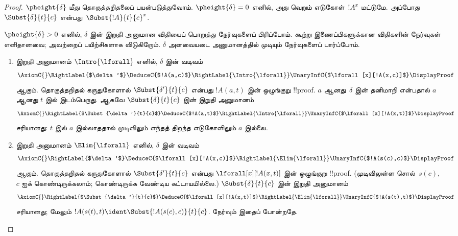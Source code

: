 \documentclass[../../../include/open-logic-section]{subfiles}
\begin{document}
\begin{proof}
  $\pheight{\delta}$ மீது தொகுத்தறிதலைப் பயன்படுத்துவோம்.
  $\pheight{\delta} = 0$ எனில், அது வெறும்
  எடுகோள்~$!A^x$ மட்டுமே. அப்போது
  $\Subst{\delta}{t}{c}$ என்பது~$\Subst{!A}{t}{c}^x$.

  $\pheight{\delta} > 0$ எனில், $\delta$ இன் இறுதி
  அனுமான விதியைப் பொறுத்து நேர்வுகளைப் பிரிப்போம்.
  கூற்று இணைப்பிகளுக்கான விதிகளின் நேர்வுகள் எளிதானவை;
  அவற்றைப் பயிற்சிகளாக விடுகிறோம். $\delta$ அளவையடை
  அனுமானத்தில் முடியும் நேர்வுகளைப் பார்ப்போம்.
  \begin{enumerate}
    \item இறுதி அனுமானம் $\Intro{\lforall}$ எனில்,
    $\delta$ இன் வடிவம்
    \[
    \AxiomC{}
    \RightLabel{$\delta'$}
    \DeduceC{$!A(a,c)$}
    \RightLabel{\Intro{\lforall}}
    \UnaryInfC{$\lforall[x][!A(x,c)]$}
    \DisplayProof
    \]
    ஆகும். தொகுத்தறிதல் கருதுகோளால்
    $\Subst{\delta'}{t}{c}$ என்பது $!A(a,t)$ இன்
    ஒழுங்குறு !!{proof}. $a$ ஆனது~$\delta$ இன்
    தனிமாறி என்பதால் $a$ ஆனது $t$ இல் இடம்பெறாது. ஆகவே
    $\Subst{\delta}{t}{c}$ இன் இறுதி அனுமானம்
    \[
    \AxiomC{}
    \RightLabel{$\Subst{\delta'}{t}{c}$}
    \DeduceC{$!A(a,t)$}
    \RightLabel{\Intro{\lforall}}
    \UnaryInfC{$\lforall[x][!A(x,t)]$}
    \DisplayProof
    \]
    சரியானது: $t$ இல் $a$ இல்லாததால் முடிவிலும்
    எந்தத் திறந்த எடுகோளிலும் $a$ இல்லை.

    \item இறுதி அனுமானம் $\Elim{\lforall}$ எனில்,
    $\delta$ இன் வடிவம்
    \[
    \AxiomC{}
    \RightLabel{$\delta'$}
    \DeduceC{$\lforall[x][!A(x,c)]$}
    \RightLabel{\Elim{\lforall}}
    \UnaryInfC{$!A(s(c),c)$}
    \DisplayProof
    \]
    ஆகும். தொகுத்தறிதல் கருதுகோளால்
    $\Subst{\delta'}{t}{c}$ என்பது
    $\lforall[x][!A(x,t)]$ இன் ஒழுங்குறு
    !!{proof}. (முடிவிலுள்ள சொல்~$s(c)$,
    $c$ ஐக் கொண்டிருக்கலாம்; கொண்டிருக்க வேண்டிய
    கட்டாயமில்லை.) $\Subst{\delta}{t}{c}$ இன்
    இறுதி அனுமானம்
    \[
    \AxiomC{}
    \RightLabel{$\Subst{\delta'}{t}{c}$}
    \DeduceC{$\lforall[x][!A(x,t)]$}
    \RightLabel{\Elim{\lforall}}
    \UnaryInfC{$!A(s(t),t)$}
    \DisplayProof
    \]
    சரியானது; மேலும்
    $!A(s(t),t) \ident \Subst{!A(s(c),c)}{t}{c}$.
    \Intro{\lexists} நேர்வும் இதைப் போன்றதே.


\end{enumerate}
\end{proof}
\end{document}
